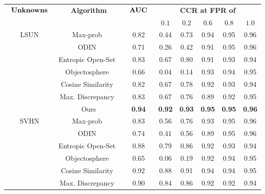 \newcommand{\SCS}{\cite{techapanurak2019hyperparameterfree,wang2018cosface}}

\begin{tabular}{cccccccc}
\toprule
\multirow{2}{*}{$\begin{array}{c}\hbox{\bf Unknowns} \\\end{array}$}&
\multirow{2}{*}{\bf Algorithm} & 
\multirow{2}{*}{ $\begin{array}{c}\hbox{\bf AUC}\end{array}$} &
\multicolumn{5}{c}{\bf CCR at FPR of} \\
& & & {$0.1$} & {$0.2$} &  {$0.6$} & {$0.8$} & {$1.0$}
\\ 
\hline
\multirow{6}{*}{LSUN}  &          
    Max-prob~\cite{hendrycks17baseline}           &  0.82 &  0.44 &  0.73 &  0.94 &  0.95 &  0.96 \\
&   ODIN~\cite{liang2017enhancing}               &  0.71 &  0.26 &  0.42 &  0.91 &  0.95 &  0.96 \\
&   Entropic Open-Set~\cite{dhamija2018reducing}  &  0.83 &  0.67 &  0.80 &  0.91 &  0.93 &  0.94 \\
&   Objectosphere~\cite{dhamija2018reducing}      &  0.66 &  0.04 &  0.14 &  0.93 &  0.94 &  0.95 \\
&   Cosine Similarity~\SCS  &  0.82 &  0.67 &  0.78 &  0.92 &  0.93 &  0.94 \\
&   Max. Discrepancy~\cite{yu2019unsupervised}        &  0.83 &  0.67 &  0.76 &  0.89 &  0.92 &  0.95 \\
&   Ours               &  \textbf{0.94} &  \textbf{0.92} &  \textbf{0.93} &  \textbf{0.95} &  \textbf{0.95} &  \textbf{0.96} \\
\cline{1-8}
\multirow{6}{*}{SVHN} &         
    Max-prob~\cite{hendrycks17baseline}           &  0.83 &  0.56 &  0.76 &  0.93 &  0.95 &  0.96 \\
&   ODIN~\cite{liang2017enhancing}               &  0.74 &  0.41 &  0.56 &  0.89 &  0.95 &  0.96 \\
&   Entropic Open-Set~\cite{dhamija2018reducing}  &  0.88 &  0.79 &  0.86 &  0.92 &  0.93 &  0.94 \\
&   Objectosphere~\cite{dhamija2018reducing}      &  0.65 &  0.06 &  0.19 &  0.92 &  0.94 &  0.95 \\
&   Cosine Similarity~\SCS  &  0.92 &  0.88 &  0.91 &  0.94 &  0.94 &  0.95 \\
&   Max. Discrepancy~\cite{yu2019unsupervised}        &  0.90 &  0.84 &  0.86 &  0.92 &  0.92 &  0.94 \\

\end{tabular}
